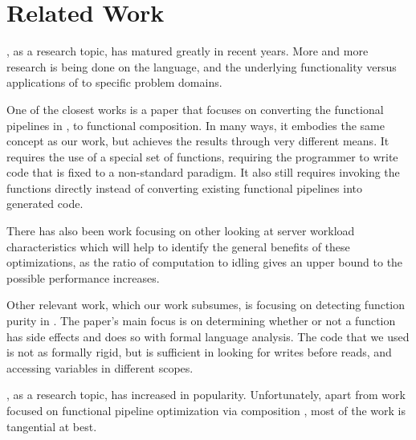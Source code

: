 \section{Related Work}

\javascript, as a research topic, has matured greatly in recent years.  More and more research is being done on \javascript the language, and the underlying functionality versus applications of \javascript to specific problem domains.

One of the closest works is a paper that focuses on converting the functional pipelines in \javascript \cite{combinators15}, to functional composition.  In many ways, it embodies the same concept as our work, but achieves the results through very different means.  It requires the use of a special set of functions, requiring the programmer to write code that is fixed to a non-standard paradigm. It also still requires invoking the functions directly instead of converting existing functional pipelines into generated code.

There has also been work focusing on other looking at server workload characteristics \cite{workload14} which will help to identify the general benefits of these optimizations, as the ratio of computation to idling gives an upper bound to the possible performance increases.

Other relevant work, which our work subsumes, is focusing on detecting function purity in \javascript \cite{purity15}.  The paper's main focus is on determining whether or not a function has side effects and does so with formal language analysis.  The code that we used is not as formally rigid, but is sufficient in looking for writes before reads, and accessing variables in different scopes.  

\javascript, as a research topic, has increased in popularity. Unfortunately, apart from work focused on functional pipeline optimization via composition \cite{combinators15}, most of the work is tangential at best.